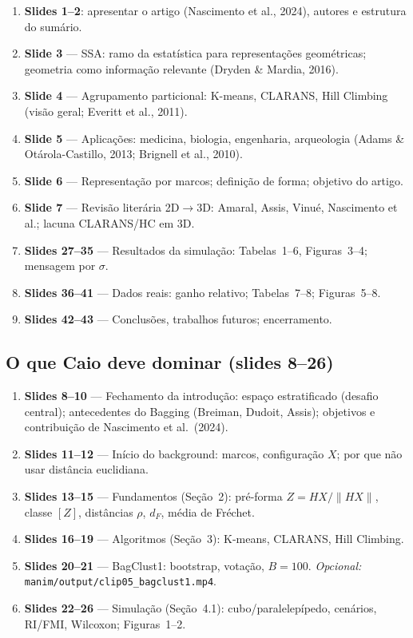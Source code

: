 \documentclass[12pt,a4paper]{article}
\begin{document}
\begin{blocomarina}
\begin{enumerate}[leftmargin=*]
  \item \textbf{Slides 1--2}: apresentar o artigo (Nascimento et al., 2024), autores e estrutura do sumário.
  \item \textbf{Slide 3} --- SSA: ramo da estatística para representações geométricas; geometria como informação relevante (Dryden \& Mardia, 2016).
  \item \textbf{Slide 4} --- Agrupamento particional: K-means, CLARANS, Hill Climbing (visão geral; Everitt et al., 2011).
  \item \textbf{Slide 5} --- Aplicações: medicina, biologia, engenharia, arqueologia (Adams \& Otárola-Castillo, 2013; Brignell et al., 2010).
  \item \textbf{Slide 6} --- Representação por marcos; definição de forma; objetivo do artigo.
  \item \textbf{Slide 7} --- Revisão literária 2D$\rightarrow$3D: Amaral, Assis, Vinué, Nascimento et al.; lacuna CLARANS/HC em 3D.
  \item \textbf{Slides 27--35} --- Resultados da simulação: Tabelas~1--6, Figuras~3--4; mensagem por $\sigma$.
  \item \textbf{Slides 36--41} --- Dados reais: ganho relativo; Tabelas~7--8; Figuras~5--8.
  \item \textbf{Slides 42--43} --- Conclusões, trabalhos futuros; encerramento.
\end{enumerate}
\end{blocomarina}

\subsection{O que Caio deve dominar (slides 8--26)}

\begin{blococaio}
\begin{enumerate}[leftmargin=*]
  \item \textbf{Slides 8--10} --- Fechamento da introdução:
        espaço estratificado (desafio central); antecedentes do Bagging (Breiman, Dudoit, Assis);
        objetivos e contribuição de Nascimento et al.\ (2024).
  \item \textbf{Slides 11--12} --- Início do background: marcos, configuração $X$; por que não usar distância euclidiana.
  \item \textbf{Slides 13--15} --- Fundamentos (Seção~2):
        pré-forma $Z = HX/\|HX\|$, classe $[Z]$, distâncias $\rho$, $d_F$, média de Fréchet.
  \item \textbf{Slides 16--19} --- Algoritmos (Seção~3): K-means, CLARANS, Hill Climbing.
  \item \textbf{Slides 20--21} --- BagClust1: bootstrap, votação, $B=100$.
        \emph{Opcional:} \texttt{manim/output/clip05\_bagclust1.mp4}.
  \item \textbf{Slides 22--26} --- Simulação (Seção~4.1): cubo/paralelepípedo, cenários, RI/FMI, Wilcoxon; Figuras~1--2.
\end{enumerate}
\end{blococaio}
\end{document}
